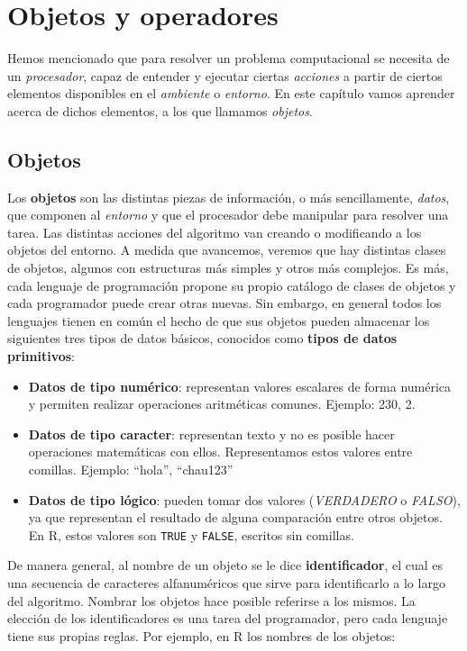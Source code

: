 \documentclass[
]{book}
\providecommand{\tightlist}{%
  \setlength{\itemsep}{0pt}\setlength{\parskip}{0pt}}
\begin{document}
\hypertarget{objetos-y-operadores}{%
\chapter{Objetos y operadores}\label{objetos-y-operadores}}

Hemos mencionado que para resolver un problema computacional se necesita de un \emph{procesador}, capaz de entender y ejecutar ciertas \emph{acciones} a partir de ciertos elementos disponibles en el \emph{ambiente} o \emph{entorno}. En este capítulo vamos aprender acerca de dichos elementos, a los que llamamos \emph{objetos}.

\hypertarget{objetos}{%
\section{Objetos}\label{objetos}}

Los \textbf{objetos} son las distintas piezas de información, o más sencillamente, \emph{datos}, que componen al \emph{entorno} y que el procesador debe manipular para resolver una tarea. Las distintas acciones del algoritmo van creando o modificando a los objetos del entorno. A medida que avancemos, veremos que hay distintas clases de objetos, algunos con estructuras más simples y otros más complejos. Es más, cada lenguaje de programación propone su propio catálogo de clases de objetos y cada programador puede crear otras nuevas. Sin embargo, en general todos los lenguajes tienen en común el hecho de que sus objetos pueden almacenar los siguientes tres tipos de datos básicos, conocidos como \textbf{tipos de datos primitivos}:

\begin{itemize}
\tightlist
\item
  \textbf{Datos de tipo numérico}: representan valores escalares de forma numérica y permiten realizar operaciones aritméticas comunes. Ejemplo: 230, 2.
\item
  \textbf{Datos de tipo caracter}: representan texto y no es posible hacer operaciones matemáticas con ellos. Representamos estos valores entre comillas. Ejemplo: ``hola'', ``chau123''
\item
  \textbf{Datos de tipo lógico}: pueden tomar dos valores (\emph{VERDADERO} o \emph{FALSO}), ya que representan el resultado de alguna comparación entre otros objetos. En R, estos valores son \texttt{TRUE} y \texttt{FALSE}, escritos sin comillas.
\end{itemize}

De manera general, al nombre de un objeto se le dice \textbf{identificador}, el cual es una secuencia de caracteres alfanuméricos que sirve para identificarlo a lo largo del algoritmo. Nombrar los objetos hace posible referirse a los mismos. La elección de los identificadores es una tarea del programador, pero cada lenguaje tiene sus propias reglas. Por ejemplo, en R los nombres de los objetos:
\end{document}
